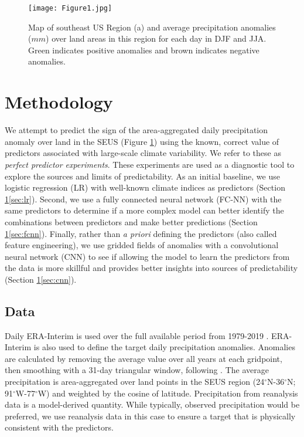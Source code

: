 \documentclass{ametsocV6.1}
\begin{document}
\begin{figure}[t]
  \noindent\texttt{[image: Figure1.jpg]}
  \caption{Map of southeast US Region (a) and average precipitation anomalies ($mm$) over land areas in this region for each day in DJF and JJA. Green indicates positive anomalies and brown indicates negative anomalies. }\label{f1}
\end{figure}

\section{Methodology}
\label{sec:methods}
We attempt to predict the sign of the area-aggregated daily precipitation anomaly over land in the SEUS (Figure \ref{f1}) using the known, correct value of predictors associated with large-scale climate variability.  We refer to these as \emph{perfect predictor experiments}. These experiments are used as a diagnostic tool to explore the sources and limits of predictability. As an initial baseline, we use logistic regression (LR) with well-known climate indices as predictors (Section \ref{sec:methods}\ref{sec:lr}). Second, we use a fully connected neural network (FC-NN) with the same predictors to determine if a more complex model can better identify the combinations between predictors and make better predictions (Section \ref{sec:methods}\ref{sec:fcnn}). Finally, rather than \emph{a priori} defining the predictors (also called feature engineering), we use gridded fields of anomalies with a convolutional neural network (CNN) to see if allowing the model to learn the predictors from the data is more skillful and provides better insights into sources of predictability (Section \ref{sec:methods}\ref{sec:cnn}).

\subsection{Data}
\label{sec:data}
Daily ERA-Interim is used over the full available period from 1979-2019 \citep{dee_era-interim_2011}.  ERA-Interim is also used to define the target daily precipitation anomalies. Anomalies are calculated by removing the average value over all years at each gridpoint, then smoothing with a 31-day triangular window, following \citet{pegion_subseasonal_2019}. The average precipitation is area-aggregated over land points in the SEUS region (24$^\circ$N-36$^\circ$N; 91$^\circ$W-77$^\circ$W) and weighted by the cosine of latitude. Precipitation from reanalysis data is a model-derived quantity. While typically, observed precipitation would be preferred, we use reanalysis data in this case to ensure a target that is physically consistent with the predictors. 
\end{document}
